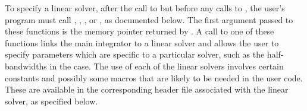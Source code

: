 To specify a {\cvodes} linear solver, after the call to 
but before any calls to , the user's program must call
, , , or ,
as documented below. The first argument passed to these functions is the {\cvodes}
memory pointer returned by .  A call to one of these
functions links the main {\cvodes} integrator to a linear solver and
allows the user to specify parameters which are specific to a
particular solver, such as the half-bandwidths in the {\cvband} case.
The use of each of the linear solvers involves certain constants and possibly 
some macros that are likely to be needed in the user code.  These are
available in the corresponding header file associated with the linear
solver, as specified below.

